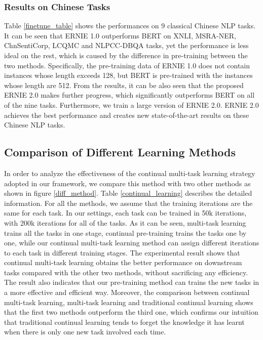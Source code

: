 \documentclass[letterpaper]{article} \usepackage{aaai20}  \usepackage{times}  \usepackage{helvet} \usepackage{courier}  \usepackage[hyphens]{url}  \usepackage{graphicx} \usepackage{makecell}
\begin{document}
\subsubsection{Results on Chinese Tasks}
Table \ref{finetune_table} shows the performances on 9 classical Chinese NLP tasks. It can be seen that ERNIE 1.0 outperforms BERT on XNLI, MSRA-NER, ChnSentiCorp, LCQMC and NLPCC-DBQA tasks, yet the performance is less ideal on the rest, which is caused by the difference in pre-training between the two methods. Specifically, the pre-training data of ERNIE 1.0 does not contain instances whose length exceeds 128, but BERT is pre-trained with the instances whose length are 512. From the results, it can be also seen that the proposed ERNIE 2.0 makes further progress, which significantly outperforms BERT on all of the nine tasks. Furthermore, we train a large version of ERNIE 2.0. ERNIE 2.0 achieves the best performance and creates new state-of-the-art results on these Chinese NLP tasks. 

\subsection{Comparison of Different Learning Methods}
In order to analyze the effectiveness of the continual multi-task learning strategy adopted in our framework, we compare this method with two other methods as shown in figure \ref{diff_method}. Table \ref{continual_learning} describes the detailed information. For all the methods, we assume that the training iterations are the same for each task. In our settings, each task can be trained in 50k iterations, with 200k iterations for all of the tasks. As it can be seen, multi-task learning trains all the tasks in one stage, continual pre-training trains the tasks one by one, while our continual multi-task learning method can assign different iterations to each task in different training stages.
The experimental result shows that continual multi-task learning obtains the better performance on downstream tasks compared with the other two methods, without sacrificing any efficiency. The result also indicates that our pre-training method can trains the new tasks in a more effective and efficient way. Moreover, the comparison between continual multi-task learning, multi-task learning and traditional continual learning shows that the first two methods outperform the third one, which confirms our intuition that traditional continual learning tends to forget the knowledge it has learnt when there is only one new task involved each time. 
\end{document}
